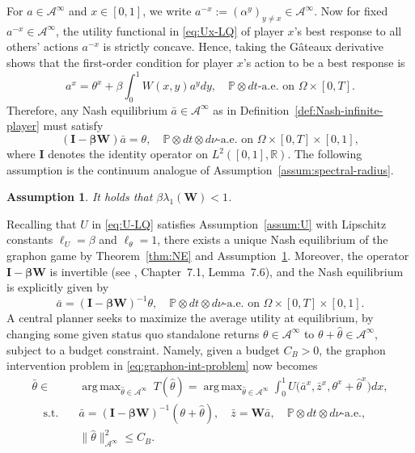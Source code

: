 \documentclass[11pt]{article}
\def\al{\alpha}
\def\P{\mathbb{P}}
\newcommand{\R}{{\mathbb R}}
\DeclareMathOperator*{\argmax}{arg\,max}
\newcommand{\be}{\begin{equation}}
\newcommand{\ee}{\end{equation}}
\newtheorem{assumption}[theorem]{Assumption}
\numberwithin{equation}{section}
\begin{document}
For $a\in\mathcal{A}^\infty$ and $x\in[0,1]$, we write $a^{-x}:=(\al^{y})_{y\neq x}\in\mathcal{A}^\infty$. Now for fixed $a^{-x}\in\mathcal{A}^{\infty}$, the utility functional in \eqref{eq:Ux-LQ} of player $x$'s best response to all others' actions $a^{-x}$ is strictly concave. Hence, taking the G\^ateaux derivative shows that the first-order condition for player $x$'s action to be a best response is
\be
a^x=\theta^x+\beta\int_0^1 W(x,y)a^ydy,\quad \P \otimes dt \textrm{-a.e.~on } \Omega \times [0,T].
\ee
Therefore, any Nash equilibrium $\bar{a}\in\mathcal{A}^\infty$ as in Definition~\ref{def:Nash-infinite-player} must satisfy
\be\label{eq-LQ:Nash-condition-graphon}
(\boldsymbol{I-\beta\boldsymbol{W}})\bar{a}=\theta,\quad \P \otimes dt \otimes d\nu \textrm{-a.e.~on } \Omega \times [0,T]\times [0,1],
\ee
where $\boldsymbol{I}$ denotes the identity operator on $L^2([0,1],\R)$. The following assumption is the continuum analogue of Assumption~\ref{assum:spectral-radius}.
\begin{assumption}\label{assum:spectral-radius-graphon}
It holds that $\beta\lambda_1(\boldsymbol{W}) <1$.
\end{assumption}
Recalling that $U$ in \eqref{eq:U-LQ} satisfies Assumption~\ref{assum:U} with Lipschitz constants $\ell_U=\beta$ and $\ell_\theta=1$, there exists a unique Nash equilibrium of the graphon game by Theorem~\ref{thm:NE} and Assumption~\ref{assum:spectral-radius-graphon}. Moreover, the operator $\boldsymbol{I-\beta\boldsymbol{W}}$ is invertible (see \cite{hall2013quantum}, Chapter~7.1, Lemma~7.6), and the Nash equilibrium is explicitly given by
\be\label{eq-LQ:graphon-Nash-equilibrium}
\bar{a}=(\boldsymbol{I-\beta\boldsymbol{W}})^{-1}\theta,\quad \P \otimes dt \otimes d\nu \textrm{-a.e.~on } \Omega \times [0,T]\times [0,1].
\ee
A central planner seeks to maximize the average utility at equilibrium, by changing some given status quo standalone returns $\theta\in\mathcal{A}^\infty$ to $\theta+\hat\theta\in\mathcal{A}^\infty$, subject to a budget constraint. Namely, given a budget $C_B>0$, the graphon intervention problem in \eqref{eq:graphon-int-problem} now becomes
\be\begin{aligned}\label{eq:graphon-int-problem-LQ}
    \bar\theta\in&\argmax_{\hat{\theta}\in\mathcal{A}^\infty}\ T(\hat{\theta})= \argmax_{\hat{\theta}\in\mathcal{A}^\infty}\int_0^1 U\big(\bar a^x,\bar z^x,\theta^x+\hat{\theta}^x\big)dx,\\
    \quad \textrm{s.t.}\quad & \bar{a}=(\boldsymbol{I-\beta\boldsymbol{W}})^{-1}(\theta+\hat\theta),\quad \bar z=\boldsymbol{W} \bar a,\quad \P \otimes dt \otimes d\nu \textrm{-a.e.}, \\
    & \|\hat{\theta}\|^2_{\mathcal{A}^\infty}\leq C_B.
\end{aligned}\ee
\end{document}

